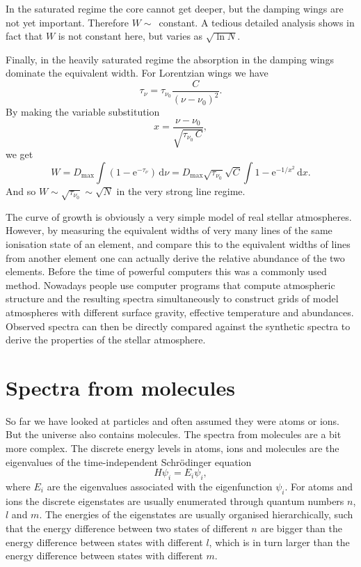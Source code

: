 \documentclass[12pt]{article}
\numberwithin{equation}{section}
\def\exp{\mathrm{e}}
\def\dd{\mathrm{d}}
\def\taunu{\ensuremath{\tau_{\nu}}}
\def\dnu{\ensuremath{\dd \nu}}
\newcommand{\be}{\begin{equation}}
\newcommand{\ee}{\end{equation}}
\begin{document}
In the saturated regime the core cannot get deeper, but the damping wings are not yet important. Therefore $W\sim$\ constant. A tedious detailed analysis shows in fact that $W$ is not constant here, but varies as $\sqrt{\ln{N}}$.

Finally, in the heavily saturated regime the absorption in the damping wings dominate the equivalent width. For Lorentzian wings we have
\be
\taunu = \tau_{\nu_0} \frac{C}{(\nu-\nu_0)^2}.
\ee
By making the variable substitution
\be
x= \frac{\nu-\nu_0}{\sqrt{ \tau_{\nu_0} \,C}},
\ee
we get 
\be
W=D_\mathrm{max} \int (1-\exp^{-\taunu}) \, \dnu = D_\mathrm{max}  \sqrt{\tau_{\nu_0}} \sqrt{C}  \int 1-\exp^{-1/x^2} \, \dd x.
\ee
And so $W \sim  \sqrt{\tau_{\nu_0}}  \sim  \sqrt{N} $ in the very strong line regime.

The curve of growth is obviously a very simple model of real stellar atmospheres. However, by measuring the equivalent widths of very many lines of the same ionisation state of an element, and compare this to the equivalent widths of lines from another element one can actually derive the relative abundance of the two elements. Before the time of powerful computers this was a commonly used method. Nowadays people use computer programs that compute atmospheric structure and the resulting spectra simultaneously to construct grids of model atmospheres with different surface gravity, effective temperature and abundances. Observed spectra can then be directly compared against the synthetic spectra to derive the properties of the stellar atmosphere.

\section{Spectra from molecules}

So far we have looked at particles and often assumed they were atoms or ions. But the universe also contains molecules. The spectra from molecules are a bit more complex. The discrete energy levels in atoms, ions and molecules are the eigenvalues of the time-independent Schr\"odinger equation
\be
H\psi_i = E_i \psi_i,
\ee
where $E_i$ are the eigenvalues associated with the eigenfunction $\psi_i$. For atoms and ions the discrete eigenstates are usually enumerated through quantum numbers $n$, $l$ and $m$. The energies of the eigenstates are usually organised hierarchically, such that the energy difference between two states of different $n$ are bigger than the energy difference between states with different $l$, which is in turn larger than the energy difference between states with different $m$.
\end{document}
